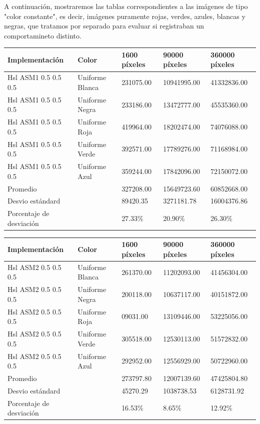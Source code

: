 A continuación, mostraremos las tablas correspondientes a las imágenes de tipo "color constante", es decir, imágenes puramente rojas, verdes, azules, blancas y negras, que tratamos por separado para evaluar si registraban un comportamineto distinto.\\

\begin{tabular}{| l | l | l | l | l |}
\hline
Implementación & Color & 1600 píxeles & 90000 píxeles & 360000 píxeles\\
\hline
Hsl ASM1 0.5 0.5 0.5 & Uniforme Blanca & 231075.00 & 10941995.00 & 41332836.00\\ 
\hline
Hsl ASM1 0.5 0.5 0.5 & Uniforme Negra & 233186.00 & 13472777.00 & 45535360.00\\ 
\hline
Hsl ASM1 0.5 0.5 0.5 & Uniforme Roja & 419964.00 & 18202474.00 & 74076088.00\\ 
\hline
Hsl ASM1 0.5 0.5 0.5 & Uniforme Verde & 392571.00 & 17789276.00 & 71168984.00\\
\hline
Hsl ASM1 0.5 0.5 0.5 & Uniforme Azul & 359244.00 & 17842096.00 & 72150072.00\\
\hline
Promedio & &  327208.00	& 15649723.60 & 60852668.00\\
\hline
Desvio estándard  &&  89420.35 & 3271181.78 & 16004376.86\\
\hline
Porcentaje de desviación  &&  27.33\% & 20.90\% & 26.30\%\\
\hline
\end{tabular}

\begin{tabular}{| l | l | l | l | l |}
\hline
Implementación & Color & 1600 píxeles & 90000 píxeles & 360000 píxeles\\
\hline
Hsl ASM2 0.5 0.5 0.5 & Uniforme Blanca & 261370.00 & 11202093.00 & 41456304.00\\ 
\hline
Hsl ASM2 0.5 0.5 0.5 & Uniforme Negra & 200118.00 & 10637117.00	& 40151872.00\\ 
\hline
Hsl ASM2 0.5 0.5 0.5 & Uniforme Roja & 09031.00	& 13109446.00 & 53225056.00\\ 
\hline
Hsl ASM2 0.5 0.5 0.5 & Uniforme Verde & 305518.00 & 12530113.00	& 51572832.00\\
\hline
Hsl ASM2 0.5 0.5 0.5 & Uniforme Azul & 292952.00 & 12556929.00 & 50722960.00\\
\hline
Promedio & &  273797.80	& 12007139.60 & 47425804.80\\
\hline
Desvio estándard  &&  45270.29	& 1038738.53	& 6128731.92\\
\hline
Porcentaje de desviación  &&  16.53\% & 	8.65\% & 	12.92\%\\
\hline
\end{tabular}

